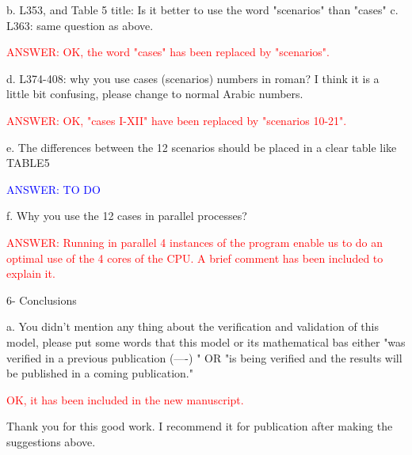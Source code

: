 \documentclass[a4paper]{article}
\begin{document}
b. L353, and Table 5 title: Is it better to use the word "scenarios" than "cases"
c. L363: same question as above.

\textcolor{red}{ANSWER: OK, the word "cases" has been replaced by "scenarios".}

d. L374-408: why you use cases (scenarios) numbers in roman? I think it is a little bit confusing, please change to normal Arabic numbers.

\textcolor{red}{ANSWER: OK, "cases I-XII" have been replaced by "scenarios
10-21".}

e. The differences between the 12 scenarios should be placed in a clear table like TABLE5

\textcolor{blue}{ANSWER: TO DO}

f. Why you use the 12 cases in parallel processes?

\textcolor{red}{ANSWER: Running in parallel 4 instances of the program enable us
to do an optimal use of the 4 cores of the CPU. A brief comment has been
included to explain it.}

6- Conclusions

a. You didn't mention any thing about the verification and validation of this model, please put some words that this model or its mathematical bas either "was verified in a previous publication (----) " OR "is being verified and the results will be published in a coming publication."

\textcolor{red}{OK, it has been included in the new manuscript.}

Thank you for this good work. I recommend it for publication after making the suggestions above. 
\end{document}

